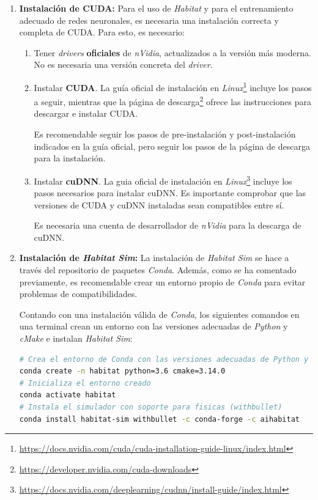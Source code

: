 \begin{enumerate}
	\item \textbf{Instalación de CUDA:} Para el uso de \textit{Habitat} y para el entrenamiento adecuado de redes neuronales, es necesaria una instalación correcta y completa de CUDA. Para esto, es necesario:
	\begin{enumerate}
		\item Tener \textit{drivers} \textbf{oficiales} de \textit{nVidia}, actualizados a la versión más moderna. No es necesaria una versión concreta del \textit{driver}.
		\item Instalar \textbf{CUDA}. La guía oficial de instalación en \textit{Linux}\footnote{\url{https://docs.nvidia.com/cuda/cuda-installation-guide-linux/index.html}} incluye los pasos a seguir, mientras que la página de descarga\footnote{\url{https://developer.nvidia.com/cuda-downloads}} ofrece las instrucciones para descargar e instalar CUDA.
		
		Es recomendable seguir los pasos de pre-instalación y post-instalación indicados en la guía oficial, pero seguir los pasos de la página de descarga para la instalación.
		
		\item Instalar \textbf{cuDNN}. La guia oficial de instalación en \textit{Linux}\footnote{\url{https://docs.nvidia.com/deeplearning/cudnn/install-guide/index.html}} incluye los pasos necesarios para instalar cuDNN. Es importante comprobar que las versiones de CUDA y cuDNN instaladas sean compatibles entre sí.
		
		Es necesaria una cuenta de desarrollador de \textit{nVidia} para la descarga de cuDNN.
	\end{enumerate}
	\item \textbf{Instalación de \textit{Habitat Sim}:} La instalación de \textit{Habitat Sim} se hace a través del repositorio de paquetes \textit{Conda}. Además, como se ha comentado previamente, es recomendable crear un entorno propio de \textit{Conda} para evitar problemas de compatibilidades. 
	
	Contando con una instalación válida de \textit{Conda}, los siguientes comandos en una terminal crean un entorno con las versiones adecuadas de \textit{Python} y \textit{cMake} e instalan \textit{Habitat Sim}:

\newpage

\begin{lstlisting}[language=bash]
# Crea el entorno de Conda con las versiones adecuadas de Python y cMake
conda create -n habitat python=3.6 cmake=3.14.0
# Inicializa el entorno creado
conda activate habitat
# Instala el simulador con soporte para fisicas (withbullet)
conda install habitat-sim withbullet -c conda-forge -c aihabitat
\end{lstlisting}	
	

\end{enumerate}
